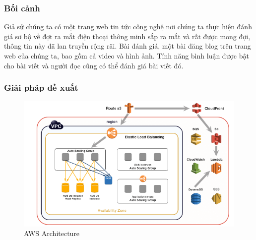 \subsubsection{Bối cảnh}
\noindent Giả sử chúng ta có một trang web tin tức công nghệ nơi chúng ta thực hiện đánh giá sơ bộ về đợt ra mắt điện thoại thông minh sắp ra mắt và rất được mong đợi, thông tin này đã lan truyền rộng rãi. Bài đánh giá, một bài đăng blog trên trang web của chúng ta, bao gồm cả video và hình ảnh. Tính năng bình luận được bật cho bài viết và người đọc cũng có thể đánh giá bài viết đó. 
\subsubsection{Giải pháp đề xuất}
\begin{figure}[H]
    \begin{center}
    \includegraphics[scale=1]{images/hieu/chap-2/aws-architecture.png}
    \vspace*{5mm}
    \caption{AWS Architecture}
    \end{center}
\end{figure} 
